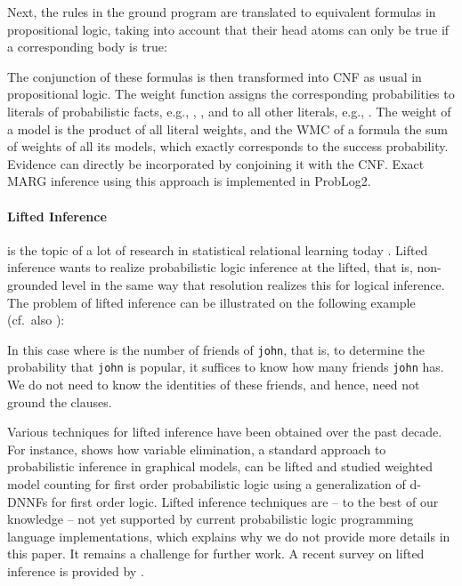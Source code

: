 \documentclass[a4paper]{article}
\begin{document}
Next, the rules in the ground program are translated to equivalent
formulas in propositional logic, taking into account that their head
atoms can only be true if a corresponding body is true:

The conjunction of these formulas is then transformed into CNF as
usual in propositional logic. The weight function assigns the corresponding probabilities to
literals of probabilistic facts, e.g., , , and  to all other literals, e.g.,
. The weight of a model is the
product of all literal weights, and the WMC of a formula the sum of
weights of all its models, which exactly corresponds to the success
probability. Evidence can directly be incorporated by conjoining it
with the CNF. 
Exact MARG inference using this approach is implemented in ProbLog2.


\paragraph{Lifted Inference} is the topic of a lot of research in statistical relational learning today \citep{kersting:ecai12,poole:ijcai03}.  Lifted inference wants to realize probabilistic logic inference
at the lifted, that is, non-grounded level in the same way that resolution realizes this for logical inference.
The problem of lifted inference can be illustrated on the following example (cf.~also \cite{Poole08}):



In this case  where  is the number of friends of \verb|john|, that is,
to determine the probability that \verb|john| is popular, it suffices
to know how many friends \verb|john| has. We do not need to
know the identities of these friends, and hence, need not
ground the clauses.   

Various techniques for lifted inference have been 
obtained over the past decade. For instance, \cite{poole:ijcai03}
shows how variable elimination, a standard approach to probabilistic
inference in graphical models,  can be lifted
and \cite{vandenbroeck:ijcai11} studied weighted model counting for first order probabilistic logic using a generalization 
of d-DNNFs for first order logic. Lifted inference techniques are -- to the best of our knowledge -- not yet supported by current
probabilistic logic programming language implementations, which explains why we do not provide more details in this paper. 
It remains a challenge for further work. 
A recent survey on lifted inference is provided by \cite{kersting:ecai12}. 
\end{document}
